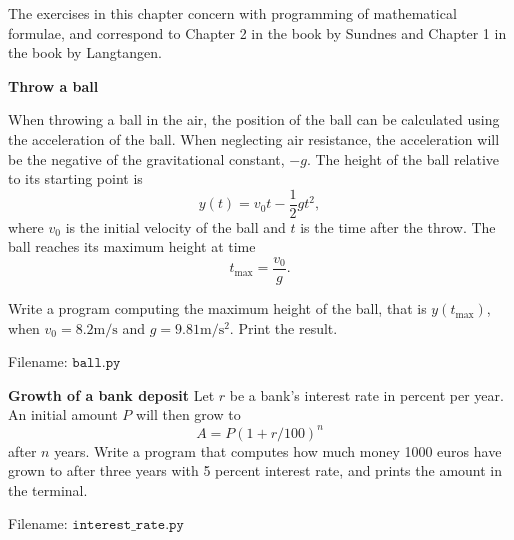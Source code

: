 The exercises in this chapter concern with programming of mathematical formulae,
and correspond to Chapter 2 in the book by Sundnes and Chapter 1 in the book by Langtangen.



\begin{Problem}{\textbf{Throw a ball}} \label{prob11}

\noindent When throwing a ball in the air, the position of the ball can be calculated using the acceleration of the ball.  When neglecting air resistance, the acceleration will be the negative of the gravitational constant, $-g$. The height of the ball relative to its starting
point is
\begin{equation*}
y(t) = v_0t - \frac{1}{2}gt^2,
\end{equation*}
where $v_0$ is the initial velocity of the ball and $t$ is the time after the throw.
The ball reaches its maximum height at time
\begin{equation*}
t_{\text{max}} = \frac{v_0}{g}.
\end{equation*}

Write a program computing the maximum height of the ball, that is $y(t_{\text{max}})$,
when $v_0 = 8.2\mathrm{m/s}$ and $g = 9.81\mathrm{m/s^2}$. Print the result.

Filename: $\texttt{ball.py}$
\end{Problem}

\begin{Problem}{\textbf{Growth of a bank deposit}}\label{prob12}
Let $r$ be a bank’s interest rate in percent per year. An initial amount $P$ will then grow to
$$
A = P(1+r/100)^n
$$
after $n$ years. Write a  program that computes how much money 1000 euros have
grown to after three years with 5 percent interest rate, and prints the amount in the terminal.

Filename: $\texttt{interest\_rate.py}$
\end{Problem}

